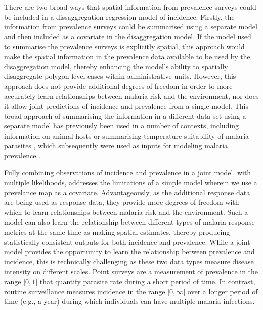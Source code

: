 \documentclass{statsoc}
\begin{document}
There are two broad ways that spatial information from prevalence surveys could be included in a dissaggregation regression model of incidence.
Firstly, the information from prevalence surveys could be summarised using a separate model and then included as a covariate in the disaggregation model.
If the model used to summarise the prevalence surveys is explicitly spatial, this approach would make the spatial information in the prevalence data available to be used by the disaggregation model, thereby enhancing the model’s ability to spatially disaggregate polygon-level cases within administrative units.
However, this approach does not provide additional degrees of freedom in order to more accurately learn relationships between malaria risk and the environment, nor does it allow joint predictions of incidence and prevalence from a single model.
This broad approach of summarising the information in a different data set using a separate model has previously been used in a number of contexts, including information on animal hosts \citep{shearer2016estimating} or summarising temperature suitability of malaria parasites \citep{weiss2014air}, which subsequently were used as inputs for modeling malaria prevalence \citep{bhatt2015effect, weiss2019mapping}.

Fully combining observations of incidence and prevalence in a joint model, with multiple likelihoods, addresses the limitations of a simple model wherein we use a prevelance map as a covariate.
Advantageously, as the additional response data are being used as response data, they provide more degrees of freedom with which to learn relationships between malaria risk and the environment.
Such a model can also learn the relationship between different types of malaria response metrics at the same time as making spatial estimates, thereby producing statistically consistent outputs for both incidence and prevalence.
While a joint model provides the opportunity to learn the relationship between prevalence and incidence, this is technically challenging as these two data types measure disease intensity on different scales.
Point surveys are a measurement of prevalence in the range $\lbrack 0, 1\rbrack$ that quantify parasite rate during a short period of time.
In contrast, routine surveillance measures incidence in the range $\lbrack 0, \infty\rbrack$ over a longer period of time (e.g., a year) during which individuals can have multiple malaria infections.
\end{document}
